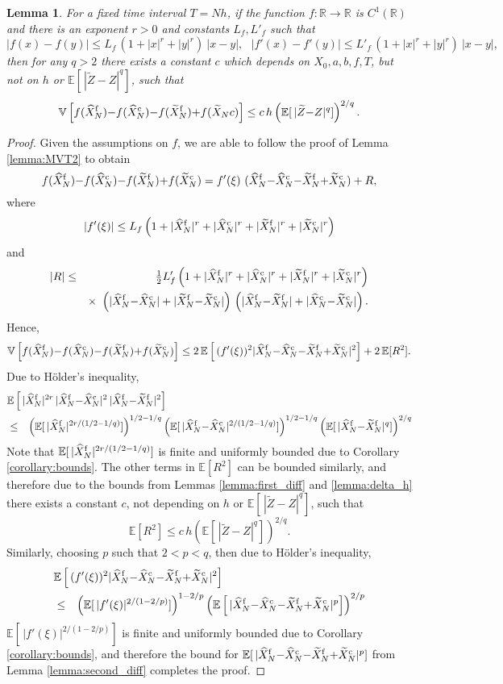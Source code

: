 \documentclass[11pt]{article}
\def \RR {{\mathbb{R}}}
\def \EE {{\mathbb{E}}}
\def \VV {{\mathbb{V}}}
\def \tZ {{\widetilde{Z}}}
\def \tX {{\widetilde{X}}}
\def \tXf  {{\widetilde{X}^{\rm f}}}
\def \tXc  {{\widetilde{X}^{\rm c}}}
\def \hXf {{\widehat{X}^{\rm f}}}
\def \hXc {{\widehat{X}^{\rm c}}}
\newcommand{\fracs}[2]{{\textstyle \frac{#1}{#2}}}
\newtheorem{lemma}[theorem]{Lemma}
\begin{document}
\begin{lemma}
\label{lemma:polynomial}
For a fixed time interval $T\!=\!N h$, if the function $f: \RR \rightarrow \RR$
is $C^1(\RR)$ and there is an exponent $r>0$ and constants $L_f, L'_f$ such that
\[
|f(x)-f(y)| \leq L_f\, (1+|x|^r+|y|^r)\ |x{-}y|, ~~~
|f'(x)-f'(y)| \leq L'_f\, (1+|x|^r+|y|^r)\ |x{-}y|,
\]
then for any $q\!>\!2$ there exists a constant $c$ which depends on 
$X_0, a, b, f, T$, but not on $h$ or $\EE[\, |\tZ{-}Z|^q]$, such that
\[
\VV\left[ f(\hXf_N){-}f(\hXc_N) {-} f(\tXf_N){+}f(\tX_Nc)\right] 
\leq c\, h \left(\EE[\, |\tZ{-}Z|^q]\right)^{2/q}.
\]
\end{lemma}
\begin{proof}
Given the assumptions on $f$, we are able to follow the proof 
of Lemma \ref{lemma:MVT2} to obtain
\[
f(\hXf_N){-}f(\hXc_N) {-} f(\tXf_N){+}f(\tXc_N)
= f'(\xi)\ (\hXf_N{-}\hXc_N{-}\tXf_N{+}\tXc_N)
+ R,
\]
where
\[
|f'(\xi)| \leq  L_f \left(1 + |\hXf_N|^r + |\hXc_N|^r + |\tXf_N|^r + |\tXc_N|^r \right)
\]
and
\begin{eqnarray*}
|R| &\leq& \fracs{1}{2} L'_f \left(1 + |\hXf_N|^r + |\hXc_N|^r + |\tXf_N|^r + |\tXc_N|^r \right)
\\ && \times \  \left( |\hXf_N{-}\hXc_N| + |\tXf_N{-}\tXc_N| \right)\, 
                \left( |\hXf_N{-}\tXf_N| + |\hXc_N{-}\tXc_N| \right).
\end{eqnarray*}
Hence,
\[
\VV\left[ f(\hXf_N){-}f(\hXc_N) {-} f(\tXf_N){+}f(\tXc_N)\right] \leq 
2\, \EE\left[\, (f'(\xi))^2|\hXf_N{-}\hXc_N{-}\tXf_N{+}\tXc_N|^2\right]
+ 2\, \EE[R^2].
\]
Due to H\"older's inequality, 
\begin{eqnarray*}
\lefteqn{
\EE\left[\, |\hXf_N|^{2r} \, |\hXf_N{-}\hXc_N|^2 \, |\hXf_N{-}\tXf_N|^2 \right] 
}
\\ &\leq& 
\left( \EE[\,|\hXf_N|^{2r/(1/2 - 1/q)}]\right)^{1/2 - 1/q}
\left( \EE[\,|\hXf_N{-}\hXc_N|^{2/(1/2 - 1/q)}]\right)^{1/2 - 1/q}
\left( \EE[\,|\hXf_N{-}\tXf_N|^q] \right)^{2/q}
\end{eqnarray*}
Note that $\EE[ \, |\hXf_N|^{2r/(1/2 - 1/q)}]$ is finite and uniformly bounded due to 
Corollary \ref{corollary:bounds}.
The other terms in $\EE[R^2]$ can be bounded similarly, and therefore due to the bounds
from Lemmas \ref{lemma:first_diff} and \ref{lemma:delta_h} there exists a constant $c$,
not depending on $h$ or $\EE[\,|\tZ{-}Z|^q]$, such that
\[
\EE[R^2] \leq c\, h \left(\EE[\,|\tZ{-}Z|^q]\right)^{2/q}.
\]
Similarly, choosing $p$ such that $2\!<\!p\!<\!q$, then due to H\"older's inequality, 
\begin{eqnarray*}
\lefteqn{
\EE\left[\, (f'(\xi))^2|\hXf_N{-}\hXc_N{-}\tXf_N{+}\tXc_N|^2\right]
}
\\ &\leq&
\left(\EE[ \, |f'(\xi)|^{2/(1-2/p)}] \right)^{1-2/p}
\left(\EE\left[\,|\hXf_N{-}\hXc_N{-}\tXf_N{+}\tXc_N|^p\right] \right)^{2/p}
\end{eqnarray*}
$\EE[ \, |f'(\xi)|^{2/(1-2/p)}]$ is finite and uniformly bounded due to 
Corollary \ref{corollary:bounds}, and therefore the bound for 
$\EE[\, |\hXf_N{-}\hXc_N{-}\tXf_N{+}\tXc_N|^p]$ from
Lemma \ref{lemma:second_diff} completes the proof.
\end{proof}
\end{document}
